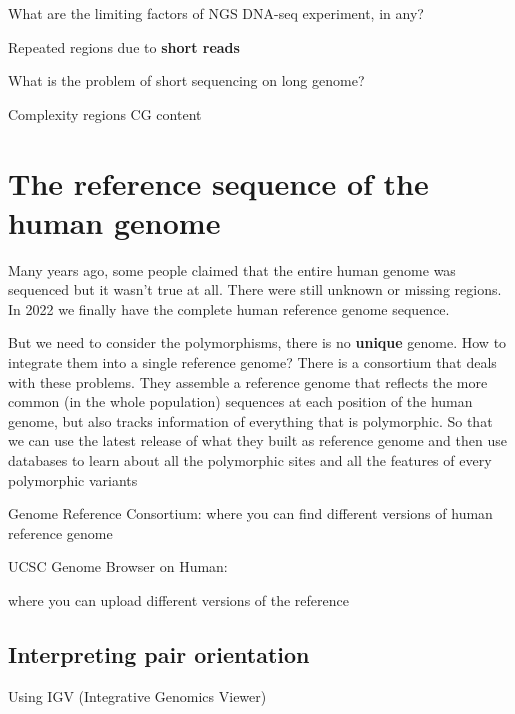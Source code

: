 What are the limiting factors of NGS DNA-seq experiment, in any?

Repeated regions due to \textbf{short reads}

What is the problem of short sequencing on long genome?

Complexity regions CG content


\hypertarget{the-reference-sequence-of-the-human-genome}{%
\section{The reference sequence of the human
genome}\label{the-reference-sequence-of-the-human-genome}}


Many years ago, some people claimed that the entire human genome was sequenced
but it wasn't true at all. There were still unknown or missing regions. In 2022
we finally have the complete human reference genome sequence.

But we need to consider the polymorphisms, there is no \textbf{unique} genome.
How to integrate them into a single reference genome? There is a consortium that
deals with these problems. They assemble a reference genome that reflects the
more common (in the whole population) sequences at each position of the human
genome, but also tracks information of everything that is polymorphic. So that
we can use the latest release of what they built as reference genome and then
use databases to learn about all the polymorphic sites and all the features of
every polymorphic variants

Genome Reference Consortium:
where you can find different versions of human reference genome

UCSC Genome Browser on Human:

where you can upload different versions of the reference


\hypertarget{interpreting-pair-orientation}{%
\subsection{Interpreting pair orientation}\label{interpreting-pair-orientation}}


Using IGV (Integrative Genomics Viewer)

